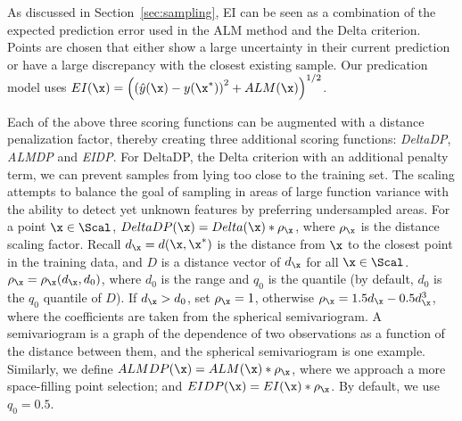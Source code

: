 %
As discussed in Section~\ref{sec:sampling}, EI can be seen as a combination of the expected prediction error used in the ALM method and the Delta criterion.
%
Points are chosen that either show a large uncertainty in their current prediction or have a large discrepancy with the closest existing sample.
%
Our predication model uses $EI(\x) = \left(\left(\hat{y}(\x) - y(\x^*)\right)^2+ ALM(\x)\right)^{1/2}$.

 Each of the above three scoring functions can be augmented with a distance penalization factor, thereby creating three additional scoring functions: \emph{DeltaDP}, \emph{ALMDP} and \emph{EIDP}.
%
For DeltaDP, the Delta criterion with an additional penalty term, we can prevent samples from lying too close to the training set.
%
The scaling attempts to balance the goal of sampling in areas of large function variance with the ability to detect yet unknown features by preferring undersampled areas.
%
For a point $\x \in \Scal$, $DeltaDP(\x) = Delta(\x) * \rho_\x$, where $\rho_\x$ is the distance scaling factor.
%
Recall $d_\x = d(\x,\x^*)$ is the distance from $\x$ to the closest point in the training data, and $D$ is a distance vector of $d_\x$ for all $\x \in \Scal$.
%
$\rho_\x = \rho_\x (d_\x, d_0)$, where $d_0$ is the range and $q_0$ is the quantile (by default, $d_0$ is the $q_0$ quantile of $D$).
%
If $d_\x>d_0$, set $\rho_\x = 1$, otherwise $\rho_\x = 1.5d_\x-0.5d_\x^3$, where the coefficients are taken from the spherical semivariogram.
%
A semivariogram is a graph of the dependence of two observations as a function of the distance between them, and the spherical semivariogram is one example.
%
Similarly, we define $ALMDP(\x) = ALM(\x) * \rho_\x$, where we approach a more space-filling point selection; and $EIDP(\x) = EI(\x) * \rho_\x$.
%
By default, we use $q_0 = 0.5$.

